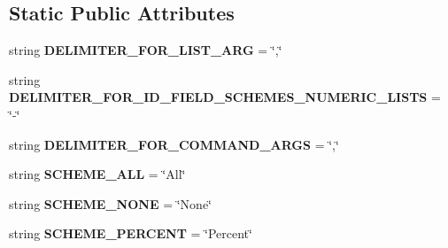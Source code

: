 \subsection*{Static Public Attributes}
\begin{DoxyCompactItemize}
\item 
string {\bfseries D\+E\+L\+I\+M\+I\+T\+E\+R\+\_\+\+F\+O\+R\+\_\+\+L\+I\+S\+T\+\_\+\+A\+RG} = \char`\"{},\char`\"{}\hypertarget{classnegui_1_1pgutilityclasses_1_1NeEstimatorSamplingSchemeParameterManager_a1dad6017f4ab842808803285a5c0483b}{}\label{classnegui_1_1pgutilityclasses_1_1NeEstimatorSamplingSchemeParameterManager_a1dad6017f4ab842808803285a5c0483b}

\item 
string {\bfseries D\+E\+L\+I\+M\+I\+T\+E\+R\+\_\+\+F\+O\+R\+\_\+\+I\+D\+\_\+\+F\+I\+E\+L\+D\+\_\+\+S\+C\+H\+E\+M\+E\+S\+\_\+\+N\+U\+M\+E\+R\+I\+C\+\_\+\+L\+I\+S\+TS} = \char`\"{}-\/\char`\"{}\hypertarget{classnegui_1_1pgutilityclasses_1_1NeEstimatorSamplingSchemeParameterManager_ab0ba346bdebcaa791a6eca8404edb24a}{}\label{classnegui_1_1pgutilityclasses_1_1NeEstimatorSamplingSchemeParameterManager_ab0ba346bdebcaa791a6eca8404edb24a}

\item 
string {\bfseries D\+E\+L\+I\+M\+I\+T\+E\+R\+\_\+\+F\+O\+R\+\_\+\+C\+O\+M\+M\+A\+N\+D\+\_\+\+A\+R\+GS} = \char`\"{},\char`\"{}\hypertarget{classnegui_1_1pgutilityclasses_1_1NeEstimatorSamplingSchemeParameterManager_a7480071418e5c1c3043fc9638a6fd313}{}\label{classnegui_1_1pgutilityclasses_1_1NeEstimatorSamplingSchemeParameterManager_a7480071418e5c1c3043fc9638a6fd313}

\item 
string {\bfseries S\+C\+H\+E\+M\+E\+\_\+\+A\+LL} = \char`\"{}All\char`\"{}\hypertarget{classnegui_1_1pgutilityclasses_1_1NeEstimatorSamplingSchemeParameterManager_a634ab5037c13202ba8596eef8403002e}{}\label{classnegui_1_1pgutilityclasses_1_1NeEstimatorSamplingSchemeParameterManager_a634ab5037c13202ba8596eef8403002e}

\item 
string {\bfseries S\+C\+H\+E\+M\+E\+\_\+\+N\+O\+NE} = \char`\"{}None\char`\"{}\hypertarget{classnegui_1_1pgutilityclasses_1_1NeEstimatorSamplingSchemeParameterManager_a4a4628d17ab27c8213a5fb3b777c5f39}{}\label{classnegui_1_1pgutilityclasses_1_1NeEstimatorSamplingSchemeParameterManager_a4a4628d17ab27c8213a5fb3b777c5f39}

\item 
string {\bfseries S\+C\+H\+E\+M\+E\+\_\+\+P\+E\+R\+C\+E\+NT} = \char`\"{}Percent\char`\"{}\hypertarget{classnegui_1_1pgutilityclasses_1_1NeEstimatorSamplingSchemeParameterManager_ada79ab1b2990e6cd6a9407ec76e224df}{}\label{classnegui_1_1pgutilityclasses_1_1NeEstimatorSamplingSchemeParameterManager_ada79ab1b2990e6cd6a9407ec76e224df}


\end{DoxyCompactItemize}
